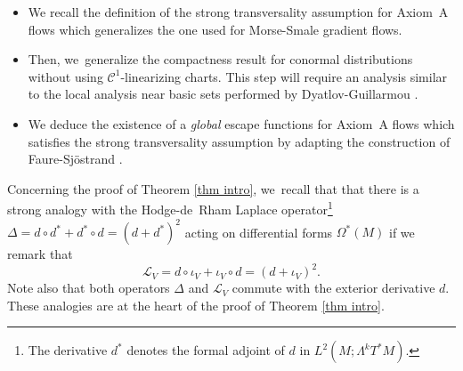 \documentclass[JEP,XML,SOM,Unicode,NoEqCountersInSection,NoFloatCountersInSection,published]{cedram}
\theoremstyle{definition}
\theoremstyle{plain}
\newcommand{\Ccal}{\mathcal{C}}
\newcommand{\Lie}{\mathcal{L}}
\begin{document}
\begin{itemize}
\item We recall the definition of the strong transversality assumption for Axiom~A flows which generalizes the one used for Morse-Smale gradient flows.
\item Then, we~generalize the compactness result for conormal distributions without using $\Ccal^1$-linearizing charts. This step will require an analysis similar to the local analysis near basic sets performed by Dyatlov-Guillarmou \cite{dyatlov-guillarmou_2016}.
\item We deduce the existence of a \emph{global} escape functions for Axiom~A flows which satisfies the strong transversality assumption by adapting the construction of Faure-Sjöstrand \cite{FS}.
\end{itemize}

Concerning the proof of Theorem \ref{thm intro}, we~recall that that there is a strong analogy with the Hodge-de~Rham Laplace operator\footnote{The derivative $d^*$ denotes the formal adjoint of $d$ in $L^2 (M; \Lambda^k T^* M)$.} $\Delta = d \circ d^* + d^* \circ d = (d + d^*)^2$ acting on differential forms $\Omega^* (M)$ if we remark that
\[
\Lie_V = d\circ \iota_V + \iota_V \circ d = (d + \iota_V)^2.
\]
Note also that both operators $\Delta$ and $\Lie_V$ commute with the exterior derivative $d$. These analogies are at the heart of the proof of Theorem \ref{thm intro}.

\end{document}
